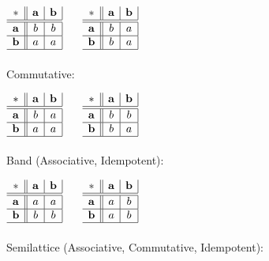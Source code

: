 $\begin{array}{c||c|c|}
  * & \mathbf{a} & \mathbf{b} \\ \hline \hline
  \mathbf{a} & b & b \\ \hline
  \mathbf{b} & a & a \\ \hline
\end{array}$ $\quad$ $\begin{array}{c||c|c|}
  * & \mathbf{a} & \mathbf{b} \\ \hline \hline
  \mathbf{a} & b & a \\ \hline
  \mathbf{b} & b & a \\ \hline
\end{array}$
\\ \\
Commutative:

$\begin{array}{c||c|c|}
  * & \mathbf{a} & \mathbf{b} \\ \hline \hline
  \mathbf{a} & b & a \\ \hline
  \mathbf{b} & a & a \\ \hline
\end{array}$ $\quad$ $\begin{array}{c||c|c|}
  * & \mathbf{a} & \mathbf{b} \\ \hline \hline
  \mathbf{a} & b & b \\ \hline
  \mathbf{b} & b & a \\ \hline
\end{array}$
\\ \\
Band (Associative, Idempotent):

$\begin{array}{c||c|c|}
  * & \mathbf{a} & \mathbf{b} \\ \hline \hline
  \mathbf{a} & a & a \\ \hline
  \mathbf{b} & b & b \\ \hline
\end{array}$ $\quad$ $\begin{array}{c||c|c|}
  * & \mathbf{a} & \mathbf{b} \\ \hline \hline
  \mathbf{a} & a & b \\ \hline
  \mathbf{b} & a & b \\ \hline
\end{array}$
\\ \\
Semilattice (Associative, Commutative, Idempotent):

